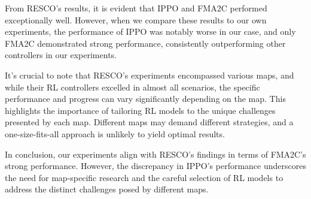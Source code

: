 \newpage

From RESCO's results, it is evident that IPPO and FMA2C performed exceptionally well. However, when we compare these results to our own experiments, the performance of IPPO was notably worse in our case, and only FMA2C demonstrated strong performance, consistently outperforming other controllers in our experiments.

It's crucial to note that RESCO's experiments encompassed various maps, and while their RL controllers excelled in almost all scenarios, the specific performance and progress can vary significantly depending on the map. This highlights the importance of tailoring RL models to the unique challenges presented by each map. Different maps may demand different strategies, and a one-size-fits-all approach is unlikely to yield optimal results.

In conclusion, our experiments align with RESCO's findings in terms of FMA2C's strong performance. However, the discrepancy in IPPO's performance underscores the need for map-specific research and the careful selection of RL models to address the distinct challenges posed by different maps.
